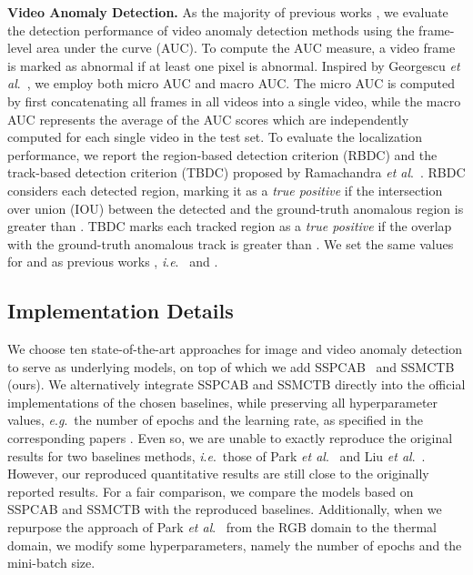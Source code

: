 \documentclass[10pt,journal,compsoc]{IEEEtran}
\newcommand{\etal}{\textit{et al}.}
\newcommand{\ie}{\textit{i}.\textit{e}.}
\newcommand{\eg}{\textit{e}.\textit{g}.}
\begin{document}
\noindent
\textbf{Video Anomaly Detection.} As the majority of previous works \cite{Ramachandra-PAMI-2020}, we evaluate the detection performance of video anomaly detection methods using the frame-level area under the curve (AUC). To compute the AUC measure, a video frame is marked as abnormal if at least one pixel is abnormal. Inspired by Georgescu \etal~\cite{Georgescu-TPAMI-2021}, we employ both micro AUC and macro AUC. The micro AUC is computed by first concatenating all frames in all videos into a single video, while the macro AUC represents the average of the AUC scores which are independently computed for each single video in the test set. To evaluate the localization performance, we report the region-based detection criterion (RBDC) and the track-based detection criterion (TBDC) proposed by Ramachandra \etal~\cite{Ramachandra-WACV-2020a}. RBDC considers each detected region, marking it as a \emph{true positive} if the intersection over union (IOU) between the detected and the ground-truth anomalous region is greater than . TBDC marks each tracked region as a \textit{true positive} if the overlap with the ground-truth anomalous track is greater than . We set the same values for  and  as previous works \cite{Ramachandra-WACV-2020a, Georgescu-TPAMI-2021}, \ie~ and .

\subsection{Implementation Details}
\label{sec_implement}

We choose ten state-of-the-art approaches \cite{Barbalau-ARXIV-2022, Zavrtanik-ICCV-2021, Schulter-ECCV-2022, Georgescu-TPAMI-2021, Liu-ICCV-2021, Park-CVPR-2020, Liu-CVPR-2018,He-CVPR-2022,Vasu-ICCV-2023,Wang-ICDM-2022} for image and video anomaly detection to serve as underlying models, on top of which we add SSPCAB~\cite{Ristea-CVPR-2022} and SSMCTB (ours). We alternatively integrate SSPCAB and SSMCTB directly into the official implementations of the chosen baselines, while preserving all hyperparameter values, \eg~the number of epochs and the learning rate, as specified in the corresponding papers \cite{Barbalau-ARXIV-2022,Zavrtanik-ICCV-2021, Schulter-ECCV-2022, Georgescu-TPAMI-2021, Liu-ICCV-2021, Park-CVPR-2020, Liu-CVPR-2018, He-CVPR-2022,Vasu-ICCV-2023,Wang-ICDM-2022}. Even so, we are unable to exactly reproduce the original results for two baselines methods, \ie~those of Park \etal~\cite{Park-CVPR-2020} and Liu \etal~\cite{Liu-CVPR-2018}. However, our reproduced quantitative results are still close to the originally reported results. For a fair comparison, we compare the models based on SSPCAB and SSMCTB with the reproduced baselines. Additionally, when we repurpose the approach of Park \etal~\cite{Park-CVPR-2020} from the RGB domain to the thermal domain, we modify some hyperparameters, namely the number of epochs and the mini-batch size. 
\end{document}
